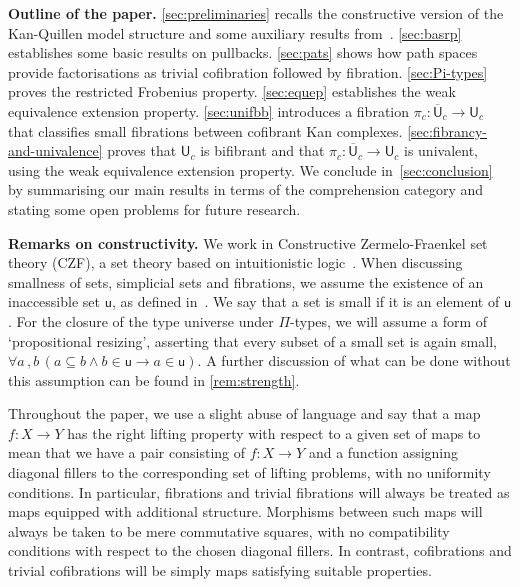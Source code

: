 \documentclass[reqno,10pt,a4paper,oneside,draft]{amsart}
\numberwithin{equation}{section}
\theoremstyle{mythm}
\theoremstyle{mydef}
\theoremstyle{myrmk}
\newcommand{\ie}{\text{i.e.\ }}
\newcommand{\co}{\colon}
\newcommand{\UU}{\overline{\mathsf{U}}}
\newcommand{\U}{\mathsf{U}}
\begin{document}
\smallskip

\noindent 
\textbf{Outline of the paper.} \cref{sec:preliminaries} recalls the constructive version of the 
Kan-Quillen model structure and some auxiliary results from~\cite{henry2019qms}. \cref{sec:basrp} establishes some basic results on pullbacks. \cref{sec:pats} shows how path spaces provide factorisations
as trivial cofibration followed by fibration. \cref{sec:Pi-types} proves the restricted Frobenius property. \cref{sec:equep}
establishes the weak equivalence extension property.
\cref{sec:unifbb} introduces a fibration $\pi_c \co \UU_c \to \U_c$ that classifies small fibrations
between cofibrant Kan complexes. \cref{sec:fibrancy-and-univalence} proves that $\U_c$ is bifibrant and that $\pi_c \co \UU_c \to \U_c$ is univalent, using the weak equivalence extension property.
We conclude in~\cref{sec:conclusion} by summarising our main results in terms of
the comprehension category and stating some open problems for future research.

\smallskip

\noindent
\textbf{Remarks on constructivity.} We work in  Constructive Zermelo-Fraenkel set theory (CZF),
a set theory based on intuitionistic logic~\cite{AczelP:typtic-I}. When discussing smallness of sets,
simplicial sets and fibrations, we assume the existence of an inaccessible set $\mathsf{u}$, as defined 
in~\cite[Definition~18.1.2]{AczelP:notcst}. We say that a set is small if it is an element of $\mathsf{u}$.
For the closure of the type universe under $\Pi$-types, we will assume a form of `propositional resizing', asserting that every subset 
of a small set is again small, \ie  $\forall a \, , b \,  ( a \subseteq b \land b \in \mathsf{u} \rightarrow a \in \mathsf{u} )$.  A further discussion of what can be done without this assumption can be found in \cref{rem:strength}. 

Throughout the paper, we use a slight abuse of language and say that a map $f \co X \to Y$ has
the right lifting property with respect to a given set of maps to mean that we have a pair consisting
of $f \co X \to Y$ and a function assigning diagonal fillers to the corresponding set of lifting problems, with
no uniformity conditions. In particular, fibrations and trivial fibrations will always be treated as maps equipped with additional structure. Morphisms between such maps will always be taken to be mere commutative squares, with no compatibility conditions with respect to the chosen diagonal fillers. In contrast, cofibrations and
trivial cofibrations will be simply maps satisfying suitable properties.
\end{document}
